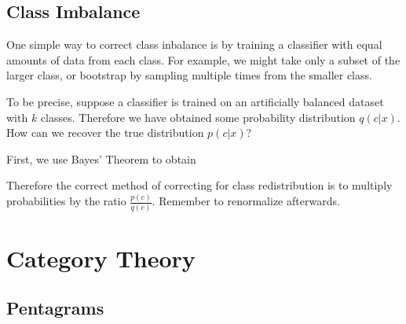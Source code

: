 \documentclass[12pt]{article}
\begin{document}
\subsection{Class Imbalance}

One simple way to correct class inbalance is by training a classifier with equal amounts of data from each class. For example, we might take only a subset of the larger class, or bootstrap by sampling multiple times from the smaller class.

To be precise, suppose a classifier is trained on an artificially balanced dataset with $k$ classes. Therefore we have obtained some probability distribution $q(c|x)$. How can we recover the true distribution $p(c|x)$?

First, we use Bayes' Theorem to obtain

Therefore the correct method of correcting for class redistribution is to multiply probabilities by the ratio $\frac{p(c)}{q(c)}$. Remember to renormalize afterwards.

\section{Category Theory}

\subsection{Pentagrams}

\end{document}
